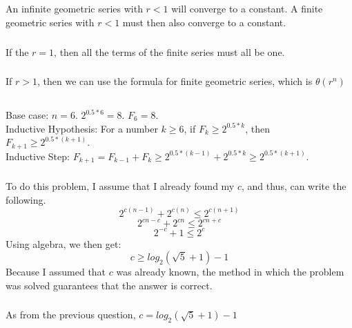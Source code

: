 \documentclass{article}
\begin{document}
\subsection{}
\subsubsection{}An infinite geometric series with $r < 1$ will converge to a constant. A finite geometric series with $r < 1$ must then also converge to a constant. 
\subsubsection{}If the $r=1$, then all the terms of the finite series must all be one. 
\subsubsection{}If $r > 1$, then we can use the formula for finite geometric series, which is $\theta(r^n)$
\subsection{}
\subsubsection{}
Base case: $n = 6$. $2^{0.5*6} = 8$. $F_6 = 8$.\\
Inductive Hypothesis: For a number $k \geq 6$, if $F_k \geq 2^{0.5*k}$, then $F_{k+1} \geq 2^{0.5*(k + 1)}$.\\
Inductive Step: $F_{k+1} = F_{k-1} + F_k \geq 2^{0.5*(k-1)} + 2^{0.5*k} \geq 2^{0.5*(k+1)}$. 
\subsubsection{}
To do this problem, I assume that I already found my $c$, and thus, can write the following. 
$$2^{c(n-1)}+2^{c(n)} \leq 2^{c(n+1)}$$
$$2^{cn-c}+2^{cn} \leq 2^{cn+c}$$
$$2^{-c}+1 \leq 2^{c}$$
Using algebra, we then get: $$c \geq log_2(\sqrt{5}+1)-1$$
Because I assumed that $c$ was already known, the method in which the problem was solved guarantees that the answer is correct. 
\subsubsection{}As from the previous question, $c = log_2(\sqrt{5}+1)-1$
\subsection{}
\end{document}
